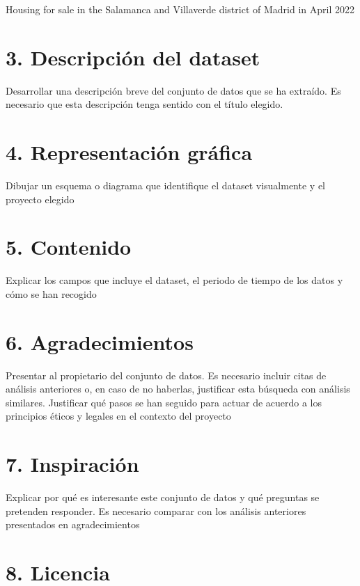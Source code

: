 \documentclass[12pt]{article}
\begin{document}
Housing for sale in the Salamanca and Villaverde district of Madrid in April 2022

\section*{3. Descripción del dataset }\vspace{-1.5em}

Desarrollar una descripción breve del conjunto de
datos que se ha extraído. Es necesario que esta descripción tenga sentido con
el título elegido.

\section*{4. Representación gráfica }\vspace{-1.5em}

Dibujar un esquema o diagrama que identifique el
dataset visualmente y el proyecto elegido

\section*{5. Contenido }\vspace{-1.5em}

Explicar los campos que incluye el dataset, el periodo de tiempo de los datos y cómo se han recogido

\section*{6. Agradecimientos }\vspace{-1.5em}

Presentar al propietario del conjunto de datos. Es necesario
incluir citas de análisis anteriores o, en caso de no haberlas, justificar esta
búsqueda con análisis similares. Justificar qué pasos se han seguido para
actuar de acuerdo a los principios éticos y legales en el contexto del proyecto

\section*{7. Inspiración }\vspace{-1.5em}

Explicar por qué es interesante este conjunto de datos y qué
preguntas se pretenden responder. Es necesario comparar con los análisis
anteriores presentados en agradecimientos

\section*{8. Licencia }\vspace{-1.5em}
\end{document}
